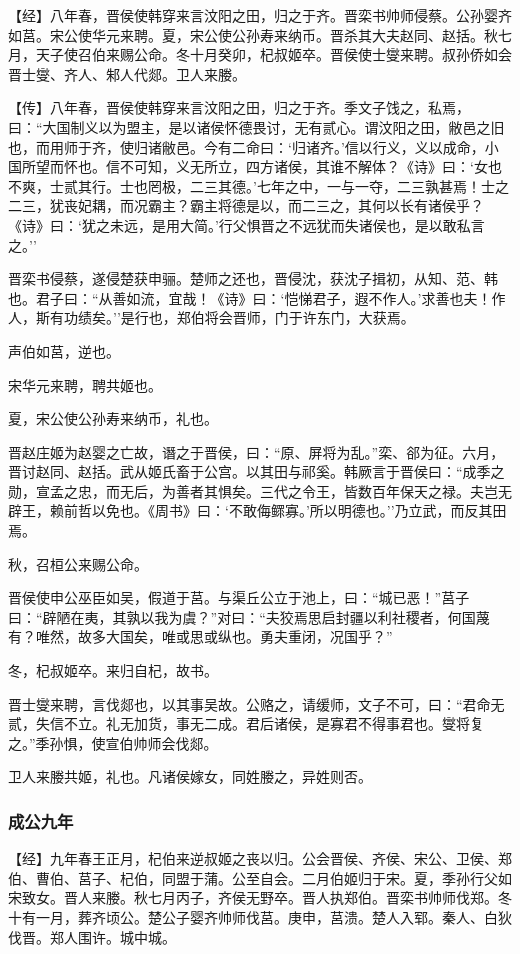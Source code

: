 \documentclass[]{article}
\begin{document}
【经】八年春，晋侯使韩穿来言汶阳之田，归之于齐。晋栾书帅师侵蔡。公孙婴齐如莒。宋公使华元来聘。夏，宋公使公孙寿来纳币。晋杀其大夫赵同、赵括。秋七月，天子使召伯来赐公命。冬十月癸卯，杞叔姬卒。晋侯使士燮来聘。叔孙侨如会晋士燮、齐人、邾人代郯。卫人来媵。

【传】八年春，晋侯使韩穿来言汶阳之田，归之于齐。季文子饯之，私焉，曰：``大国制义以为盟主，是以诸侯怀德畏讨，无有贰心。谓汶阳之田，敝邑之旧也，而用师于齐，使归诸敝邑。今有二命曰：`归诸齐。'信以行义，义以成命，小国所望而怀也。信不可知，义无所立，四方诸侯，其谁不解体？《诗》曰：`女也不爽，士贰其行。士也罔极，二三其德。'七年之中，一与一夺，二三孰甚焉！士之二三，犹丧妃耦，而况霸主？霸主将德是以，而二三之，其何以长有诸侯乎？《诗》曰：`犹之未远，是用大简。'行父惧晋之不远犹而失诸侯也，是以敢私言之。''

晋栾书侵蔡，遂侵楚获申骊。楚师之还也，晋侵沈，获沈子揖初，从知、范、韩也。君子曰：``从善如流，宜哉！《诗》曰：`恺悌君子，遐不作人。'求善也夫！作人，斯有功绩矣。''是行也，郑伯将会晋师，门于许东门，大获焉。

声伯如莒，逆也。

宋华元来聘，聘共姬也。

夏，宋公使公孙寿来纳币，礼也。

晋赵庄姬为赵婴之亡故，谮之于晋侯，曰：``原、屏将为乱。''栾、郤为征。六月，晋讨赵同、赵括。武从姬氏畜于公宫。以其田与祁奚。韩厥言于晋侯曰：``成季之勋，宣孟之忠，而无后，为善者其惧矣。三代之令王，皆数百年保天之禄。夫岂无辟王，赖前哲以免也。《周书》曰：`不敢侮鳏寡。'所以明德也。''乃立武，而反其田焉。

秋，召桓公来赐公命。

晋侯使申公巫臣如吴，假道于莒。与渠丘公立于池上，曰：``城已恶！''莒子曰：``辟陋在夷，其孰以我为虞？''对曰：``夫狡焉思启封疆以利社稷者，何国蔑有？唯然，故多大国矣，唯或思或纵也。勇夫重闭，况国乎？''

冬，杞叔姬卒。来归自杞，故书。

晋士燮来聘，言伐郯也，以其事吴故。公赂之，请缓师，文子不可，曰：``君命无贰，失信不立。礼无加货，事无二成。君后诸侯，是寡君不得事君也。燮将复之。''季孙惧，使宣伯帅师会伐郯。

卫人来媵共姬，礼也。凡诸侯嫁女，同姓媵之，异姓则否。

\hypertarget{header-n1640}{%
\subsubsection{成公九年}\label{header-n1640}}

【经】九年春王正月，杞伯来逆叔姬之丧以归。公会晋侯、齐侯、宋公、卫侯、郑伯、曹伯、莒子、杞伯，同盟于蒲。公至自会。二月伯姬归于宋。夏，季孙行父如宋致女。晋人来媵。秋七月丙子，齐侯无野卒。晋人执郑伯。晋栾书帅师伐郑。冬十有一月，葬齐顷公。楚公子婴齐帅师伐莒。庚申，莒溃。楚人入郓。秦人、白狄伐晋。郑人围许。城中城。
\end{document}
